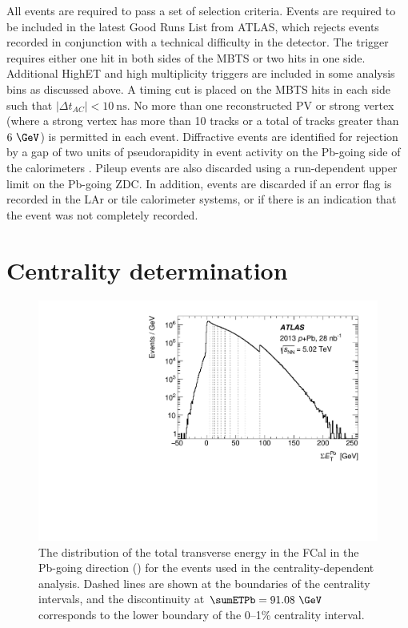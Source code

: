 All events are required to pass a set of \minbias selection criteria.
Events are required to be included in the latest Good Runs List from ATLAS, which rejects events recorded in conjunction with a technical difficulty in the detector.
The \minbias trigger requires either one hit in both sides of the \ac{MBTS} or two hits in one side.
Additional \ac{HighET} and high multiplicity triggers are included in some analysis bins as discussed above.
A timing cut is placed on the \ac{MBTS} hits in each side such that $|\Delta t_{AC}| < 10~\textrm{ns}$.
No more than one reconstructed \ac{PV} or strong vertex (where a strong vertex has more than 10 tracks or a total \pt of tracks greater than $6~\GeV$) is permitted in each event.
Diffractive events are identified for rejection by a gap of two units of pseudorapidity in event activity on the Pb-going side of the calorimeters \cite{HION-2012-15}.
Pileup events are also discarded using a run-dependent upper limit on the Pb-going \ac{ZDC}.
In addition, events are discarded if an error flag is recorded in the \ac{LAr} or tile calorimeter systems, or if there is an indication that the event was not completely recorded.

\section{Centrality determination}

\begin{figure}[t]
\includegraphics{fcal_et_total.pdf}
\caption{The distribution of the total transverse energy in the \ac{FCal} in the Pb-going direction (\sumETPb) for the events used in the centrality-dependent analysis. Dashed lines are shown at the boundaries of the centrality intervals, and the discontinuity at $\sumETPb = 91.08~\GeV$ corresponds to the lower \sumETPb boundary of the 0--1\% centrality interval.}
\label{fig:fcal_et}
\end{figure}

